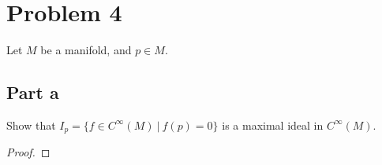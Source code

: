 \documentclass[fontsize=11pt]{scrartcl} %
\numberwithin{equation}{section} %
\numberwithin{figure}{section} %
\numberwithin{table}{section} %
\begin{document}
\newpage
\section*{Problem 4}
Let $M$ be a manifold, and $p\in M$.
\subsection*{Part a}
Show that $I_p = \{f\in C^{\infty}(M)\ |\ f(p)=0\}$ is a maximal ideal in $C^{\infty}(M)$.
\\
\begin{proof}

\end{proof}
\newpage

\end{document}
